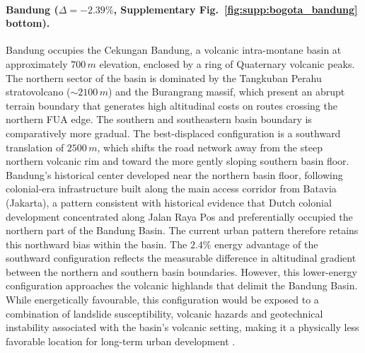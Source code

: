 \documentclass[11pt]{article}
\begin{document}
\paragraph{Bandung ($\Delta = -2.39\%$, Supplementary Fig.~\ref{fig:supp:bogota_bandung} bottom).} Bandung occupies the Cekungan Bandung, a volcanic intra-montane basin at approximately $700\, m$ elevation, enclosed by a ring of Quaternary volcanic peaks. The northern sector of the basin is dominated by the Tangkuban Perahu stratovolcano ($\sim 2100 \, m$) and the Burangrang massif, which present an abrupt terrain boundary that generates high altitudinal costs on routes crossing the northern FUA edge. The southern and southeastern basin boundary is comparatively more gradual. The best-displaced configuration is a southward translation of $2500\, m$, which shifts the road network away from the steep northern volcanic rim and toward the more gently sloping southern basin floor. Bandung’s historical center developed near the northern basin floor, following colonial-era infrastructure built along the main access corridor from Batavia (Jakarta), a pattern consistent with historical evidence that Dutch colonial development concentrated along Jalan Raya Pos and preferentially occupied the northern part of the Bandung Basin. The current urban pattern therefore retains this northward bias within the basin. The $2.4\%$ energy advantage of the southward configuration reflects the measurable difference in altitudinal gradient between the northern and southern basin boundaries. However, this lower-energy  configuration approaches the volcanic highlands that delimit the Bandung Basin. While energetically favourable, this configuration would be exposed to a combination of landslide susceptibility, volcanic hazards and geotechnical instability associated with the basin's volcanic setting, making it a physically less favorable location for long-term urban development \cite{bandung1, bandung2,bandung3}.
\end{document}
